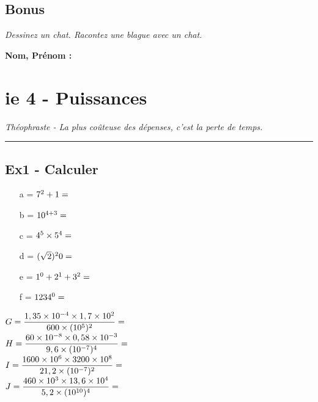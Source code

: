 \documentclass[12pt]{article}
\newcommand{\horrule}[1]{\rule{\linewidth}{#1}} %
\newcommand{\Pointilles}[1]{%
  \par\nobreak
  \noindent\rule{0pt}{1.5\baselineskip}%
  \multido{}{#1}{\noindent\makebox[\linewidth]{\dotfill}\endgraf}%
  \bigskip%
}
\begin{document}
\Pointilles{20}

\subsection*{Bonus}

\textit{Dessinez un chat. Racontez une blague avec un chat.}


%
%

\newpage

%
%
\textbf{Nom, Prénom : }

\section*{ie 4 - Puissances}
\begin{center}
  \textit{Théophraste - La plus coûteuse des dépenses, c’est la perte de temps.}
\end{center}
\horrule{2px}

\subsection*{Ex1 - Calculer}

\begin{multicols}{3}
  \begin{itemize}
  \item[a =] $7^2 + 1 =  \dotfill $
  \item[b =] $10^{4+3} =  \dotfill $
  \item[c =] $4^5 \times 5^4 =  \dotfill $
  \item[d =] $(\sqrt{2})^20 =  \dotfill $
  \item[e =] $1^0 + 2^1 + 3^2 =  \dotfill $
  \item[f =] $1234^0 =  \dotfill $
  \end{itemize}

\end{multicols}

\begin{multicols}{2}

  $G = \dfrac{1,35 \times 10^{-4} \times 1,7 \times 10^{2}}{600 \times (10^5)^2} =  \dotfill $\\
  $H = \dfrac{60 \times 10^{-8} \times 0,58 \times 10^{-3}}{9,6 \times (10^{-7})^4} =  \dotfill $ \\
  $I = \dfrac{1600 \times 10^{6} \times 3200 \times 10^{8}}{21,2 \times (10^{-7})^2} =  \dotfill $\\
  $J = \dfrac{460 \times 10^{3} \times 13,6 \times 10^{4}}{5,2 \times (10^{10})^4} =  \dotfill $ 

\end{multicols}
\end{document}

